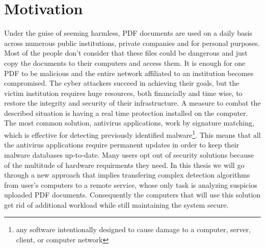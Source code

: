 \section{Motivation}
\label{section:motivation}
Under the guise of seeming harmless, PDF documents are used on a daily basis across numerous public institutions, private companies and for personal purposes. Most of the people don't consider that these files could be dangerous and just copy the documents to their computers and access them. It is enough for one PDF to be malicious and the entire network affiliated to an institution becomes compromised. The cyber attackers succeed in achieving their goals, but the victim institution requires huge resources, both financially and time wise, to restore the integrity and security of their infrastructure. A measure to combat the described situation is having a real time protection installed on the computer. The most common solution, antivirus applications, work by signature matching, which is effective for detecting previously identified malware\footnote{any software intentionally designed to cause damage to a computer, server, client, or computer network}. This means that all the antivirus applications require permanent updates in order to keep their malware databases up-to-date. Many users opt out of security solutions because of the multitude of hardware requirments they need. In this thesis we will go through a new approach that implies transfering complex detection algorithms from user's computers to a remote service, whose only task is analyzing suspicios uploaded PDF documents. Consequently the computers that will use this solution get rid of additional workload while still maintaining the system secure.



